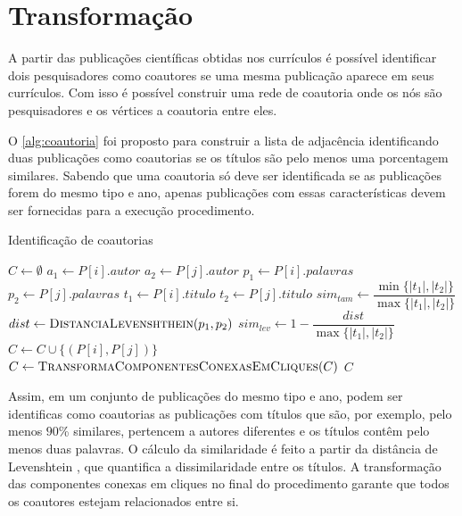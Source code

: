 \section{Transformação}

A partir das publicações científicas obtidas nos currículos é possível identificar dois pesquisadores como coautores se uma mesma publicação aparece em seus currículos. Com isso é possível construir uma rede de coautoria onde os nós são pesquisadores e os vértices a coautoria entre eles.

O \autoref{alg:coautoria} foi proposto para construir a lista de adjacência identificando duas publicações como coautorias se os títulos são pelo menos uma porcentagem similares. Sabendo que uma coautoria só deve ser identificada se as publicações forem do mesmo tipo e ano, apenas publicações com essas características devem ser fornecidas para a execução procedimento.

\begin{algorithm}
\caption{Identificação de coautorias}
\label{alg:coautoria}
\begin{algorithmic}[1]
    \State $C\gets \emptyset$
            \State $a_1 \gets P[i].autor$
            \State $a_2 \gets P[j].autor$
            \State $p_1 \gets P[i].palavras$
            \State $p_2 \gets P[j].palavras$
            \State $t_1 \gets P[i].titulo$
            \State $t_2 \gets P[j].titulo$
            \State $sim_{tam}\gets \dfrac{\min\{|t_1|, |t_2|\}}{\max\{|t_1|, |t_2|\}}$
                \State $dist\gets \Call{DistanciaLevenshthein}{p_1, p_2}$
                \State $sim_{lev}\gets 1 - \dfrac{dist}{\max\{|t_1|, |t_2|\}}$
                    \State $C\gets C\cup\{(P[i], P[j])\}$
                \EndIf
            \EndIf
        \EndFor
    \EndFor
    \State $C\gets \Call{TransformaComponentesConexasEmCliques}{C}$
    \State \Return $C$
\EndProcedure
\end{algorithmic}
\end{algorithm}

Assim, em um conjunto de publicações do mesmo tipo e ano, podem ser identificas como coautorias as publicações com títulos que são, por exemplo, pelo menos $90$\% similares, pertencem a autores diferentes e os títulos contêm pelo menos duas palavras. O cálculo da similaridade é feito a partir da distância de Levenshtein \cite{levenshtein1965binary}, que quantifica a dissimilaridade entre os títulos. A transformação das componentes conexas em cliques no final do procedimento garante que todos os coautores estejam relacionados entre si.

